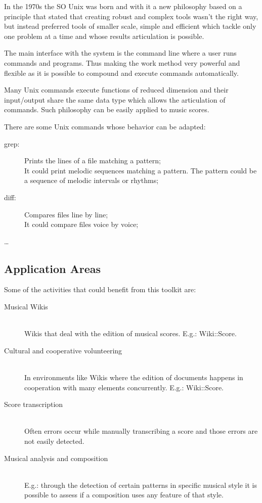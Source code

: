 \documentclass[main.tex]{subfiles}
\begin{document}
In the 1970s the \ac{SO} Unix was born and with it a new philosophy\cite{raymond2004art} based on a
principle that stated that creating robust and complex tools wasn't the right way, but instead
preferred tools of smaller scale, simple and efficient which tackle only one problem at a time and
whose results articulation is possible.

The main interface with the system is the command line where a user runs commands and programs. Thus
making the work method very powerful and flexible as it is possible to compound and execute commands
automatically.

Many Unix commands execute functions of reduced dimension and their input/output share the same data
type which allows the articulation of commands. Such philosophy can be easily applied to music
scores.

There are some Unix commands whose behavior can be adapted:
\begin{description}
  \item[grep:]
    Prints the lines of a file matching a pattern;\\
    It could print melodic sequences matching a pattern. The pattern could be a sequence of melodic
    intervals or rhythms;
  \item[diff:] 
    Compares files line by line;\\
    It could compare files voice by voice;
  \item[\ldots]
\end{description}

\subsection{Application Areas}

Some of the activities that could benefit from this toolkit are:
\begin{description}
  \item[Musical Wikis] \hfill \\
    Wikis that deal with the edition of musical scores. E.g.: Wiki::Score.
  \item[Cultural and cooperative volunteering] \hfill \\
    In environments like Wikis where the edition of documents happens in cooperation with many
    elements concurrently. E.g.: Wiki::Score.
  \item[Score transcription] \hfill \\
    Often errors occur while manually transcribing a score and those errors are not easily detected.
  \item[Musical analysis and composition] \hfill \\
    E.g.: through the detection of certain patterns in specific musical style it is possible to
    assess if a composition uses any feature of that style.
\end{description}
\end{document}
